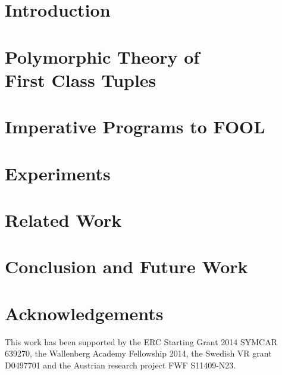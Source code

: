 




\section{Introduction}
\label{sec:boogie/introduction}


\section[Polymorphic Theory of First Class Tuples]{Polymorphic Theory of\\First Class Tuples}
\label{sec:boogie/tuples}


\section{Imperative Programs to FOOL}
\label{sec:boogie/technique}


\section{Experiments}
\label{sec:boogie/experiments}


\section{Related Work}
\label{sec:boogie/related}


\section{Conclusion and Future Work}
\label{sec:boogie/conclusions}


\section*{Acknowledgements}
This work has been supported by the ERC Starting Grant 2014 SYMCAR 639270, the Wallenberg Academy Fellowship 2014, the Swedish VR grant D0497701 and the Austrian research project FWF S11409-N23.